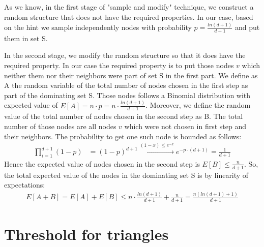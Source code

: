 \documentclass[11pt]{537homework}
\begin{document}
\subsection{} 
As we know, in the first stage of "sample and modify" technique, we construct a random structure that does not have the required properties. In our case, based on the hint we sample independently nodes with probability $p = \frac{ln(d+1)}{d+1}$ and put them in set S. 
\par \par In the second stage, we modify the random structure so that it does have the required property. In our case the required property is to put those nodes $v$ which neither them nor their neighbors were part of set S in the first part. We define as A the random variable of the total number of nodes chosen in the first step as part of the dominating set S. Those nodes follows a Binomial distribution with expected value of $E[A] = n \cdot p = n \cdot \frac{ln(d+1)}{d+1}$. Moreover, we define the random value of the total number of nodes chosen in the second step as B. The total number of those nodes are all nodes $v$ which were not chosen in first step and their neighbors. The probability to get one such node is bounded as follows:
\begin{align*}
   \prod_{i=1}^{d+1} (1-p) &= (1-p)^{d+1} \xrightarrow{(1-x)\leq e^{-x}}
   e^{-p\cdot (d+1)} = \frac{1}{d+1}
\end{align*}
Hence the expected value of nodes chosen in the second step is $E[B] \leq \frac{n}{d+1}$. 
So, the total expected value of the nodes in the dominating set S is by linearity of expectations:
\begin{align*}
   E[A+B] = E[A]+ E[B] \leq n \cdot \frac{ln(d+1)}{d+1} + \frac{n}{d+1} = \frac{n(ln(d+1)+1)}{d+1}
\end{align*}
\section{Threshold for triangles}
\end{document}
